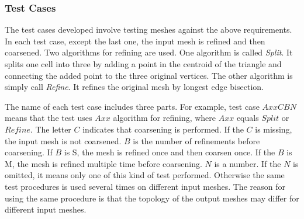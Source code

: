 \documentclass[12pt,titlepage]{article}
\begin{document}
\subsubsection{Test Cases\label{TCs}}
The test cases developed involve testing meshes against the above requirements. In each test case, except the last one, the input mesh is refined and then coarsened. Two algorithms for refining are used. One algorithm is called {\em Split}. It splits one cell into three by adding a point in the centroid of the triangle and connecting the added point to the three original vertices. The other algorithm is simply call {\em Refine}. It refines the original mesh by longest edge bisection. 

The name of each test case includes three parts. For example, test case $AxxCBN$ means that the test uses $Axx$ algorithm for refining, where $Axx$ equals $Split$ or $Refine$. The letter $C$ indicates that coarsening is performed. If the $C$ is missing, the input mesh is not coarsened. $B$ is the number of refinements before coarsening. If $B$ is S, the mesh is refined once and then coarsen once. If the $B$ is M, the mesh is refined multiple time before coarsening. $N$ is a number. If the $N$ is omitted, it means only one of this kind of test performed. Otherwise the same test procedures is used several times on different input meshes. The reason for using the same procedure is that the topology of the output meshes may differ for different input meshes.
\end{document}
